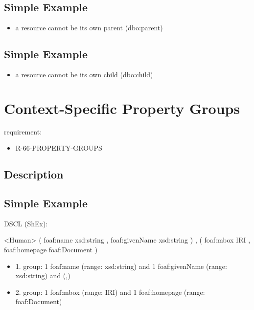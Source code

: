 \documentclass{llncs}
\begin{document}
\subsection{Simple Example}

\begin{itemize}
	\item a resource cannot be its own parent (dbo:parent)
\end{itemize}

\subsection{Simple Example}

\begin{itemize}
	\item a resource cannot be its own child (dbo:child)
\end{itemize}

\section{Context-Specific Property Groups}

requirement:

\begin{itemize}
	\item R-66-PROPERTY-GROUPS
\end{itemize}

\subsection{Description}

\subsection{Simple Example}

DSCL (ShEx):
\begin{ex}
<Human> { 
    (  
        foaf:name xsd:string ,
        foaf:givenName xsd:string 
    ) ,
    (
        foaf:mbox IRI ,
        foaf:homepage foaf:Document
    ) }
\end{ex}

\begin{itemize}
	\item 1. group: 1 foaf:name (range: xsd:string) and 1 foaf:givenName (range: xsd:string) and (,)
	\item 2. group: 1 foaf:mbox (range: IRI) and 1 foaf:homepage (range: foaf:Document) 
\end{itemize}
\end{document}

